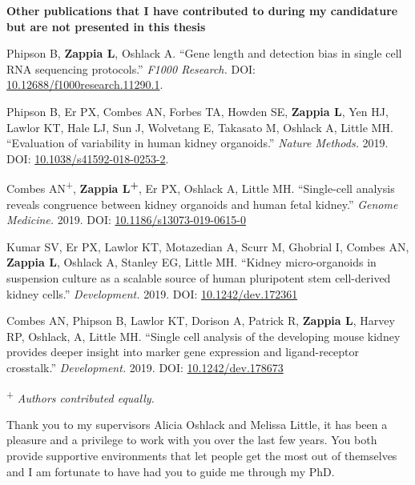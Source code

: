 \documentclass[11pt,a4paper,titlepage,twoside,openright]{style/unimelbthesis}
\theoremstyle{definition}
\theoremstyle{definition}
\theoremstyle{definition}
\theoremstyle{remark}
\begin{document}
\begin{frontmatter}
\begin{preface}
    \textbf{Other publications that I have contributed to during my candidature but are not presented in this thesis}
    
    Phipson B, \textbf{Zappia L}, Oshlack A. ``Gene length and detection bias in single cell RNA sequencing protocols.'' \emph{F1000 Research.} DOI: \href{https://doi.org/10.12688/f1000research.11290.1}{10.12688/f1000research.11290.1}.
    
    Phipson B, Er PX, Combes AN, Forbes TA, Howden SE, \textbf{Zappia L}, Yen HJ, Lawlor KT, Hale LJ, Sun J, Wolvetang E, Takasato M, Oshlack A, Little MH. ``Evaluation of variability in human kidney organoids.'' \emph{Nature Methods.} 2019. DOI: \href{http://doi.org/10.1038/s41592-018-0253-2}{10.1038/s41592-018-0253-2}.
    
    Combes AN\textsuperscript{+}, \textbf{Zappia L\textsuperscript{+}}, Er PX, Oshlack A, Little MH. ``Single-cell analysis reveals congruence between kidney organoids and human fetal kidney.'' \emph{Genome Medicine.} 2019. DOI: \href{https://doi.org/10.1186/s13073-019-0615-0}{10.1186/s13073-019-0615-0}
    
    Kumar SV, Er PX, Lawlor KT, Motazedian A, Scurr M, Ghobrial I, Combes AN, \textbf{Zappia L}, Oshlack A, Stanley EG, Little MH. ``Kidney micro-organoids in suspension culture as a scalable source of human pluripotent stem cell-derived kidney cells.'' \emph{Development.} 2019. DOI: \href{http://doi.org/10.1242/dev.172361}{10.1242/dev.172361}
    
    Combes AN, Phipson B, Lawlor KT, Dorison A, Patrick R, \textbf{Zappia L}, Harvey RP, Oshlack, A, Little MH. ``Single cell analysis of the developing mouse kidney provides deeper insight into marker gene expression and ligand-receptor crosstalk.'' \emph{Development.} 2019. DOI: \href{http://doi.org/10.1242/dev.178673}{10.1242/dev.178673}
    
    \textsuperscript{+} \emph{Authors contributed equally.}
  \end{preface}


  \begin{acknowledgements}
    Thank you to my supervisors Alicia Oshlack and Melissa Little, it has been a pleasure and a privilege to work with you over the last few years. You both provide supportive environments that let people get the most out of themselves and I am fortunate to have had you to guide me through my PhD.
    

\end{acknowledgements}
\end{frontmatter}
\end{document}
